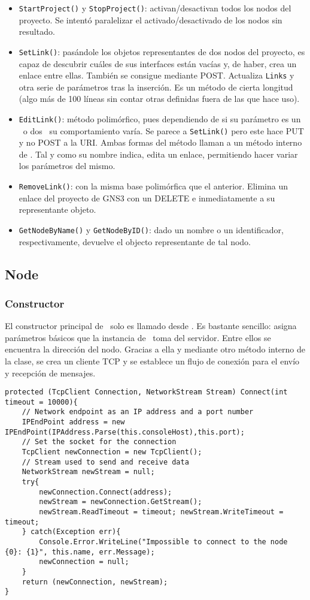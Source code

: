 \begin{itemize}
\item \texttt{StartProject()} y \texttt{StopProject()}: activan/desactivan todos los nodos del proyecto. Se intentó paralelizar el activado/desactivado de los nodos sin resultado.
\item \texttt{SetLink()}: pasándole los objetos representantes de dos nodos del proyecto, es capaz de descubrir cuáles de sus interfaces están vacías y, de haber, crea un enlace entre ellas. También se consigue mediante POST. Actualiza \texttt{Links} y otra serie de parámetros tras la inserción. Es un método de cierta longitud (algo más de 100 líneas sin contar otras definidas fuera de las que hace uso).
\item \texttt{EditLink()}: método polimórfico, pues dependiendo de si su parámetro es un \LINK~o dos \NODE~su comportamiento varía. Se parece a \texttt{SetLink()} pero este hace PUT y no POST a la URI. Ambas formas del método llaman a un método interno de \LINK. Tal y como su nombre indica, edita un enlace, permitiendo hacer variar los parámetros del mismo.
\item \texttt{RemoveLink()}: con la misma base polimórfica que el anterior. Elimina un enlace del proyecto de GNS3 con un DELETE e inmediatamente a su representante objeto.
\item \texttt{GetNodeByName()} y \texttt{GetNodeByID()}: dado un nombre o un identificador, respectivamente, devuelve el objecto representante de tal nodo.
\end{itemize}

\subsection{Node}
\subsubsection{Constructor}
El constructor principal de \NODE~solo es llamado desde \GNSCS. Es bastante sencillo: asigna parámetros básicos que la instancia de \GNSCS~toma del servidor. Entre ellos se encuentra la dirección del nodo. Gracias a ella y mediante otro método interno de la clase, se crea un cliente TCP y se establece un flujo de conexión para el envío y recepción de mensajes.

\begin{lstlisting}[language={[Sharp]C}, caption={Establecimiento de la conexión con el nodo}, label={node2}]
protected (TcpClient Connection, NetworkStream Stream) Connect(int timeout = 10000){
    // Network endpoint as an IP address and a port number
    IPEndPoint address = new IPEndPoint(IPAddress.Parse(this.consoleHost),this.port);
    // Set the socket for the connection
    TcpClient newConnection = new TcpClient();
    // Stream used to send and receive data
    NetworkStream newStream = null;
    try{
        newConnection.Connect(address);
        newStream = newConnection.GetStream();
        newStream.ReadTimeout = timeout; newStream.WriteTimeout = timeout;
    } catch(Exception err){
        Console.Error.WriteLine("Impossible to connect to the node {0}: {1}", this.name, err.Message);
        newConnection = null;
    }
    return (newConnection, newStream);
}
\end{lstlisting}

